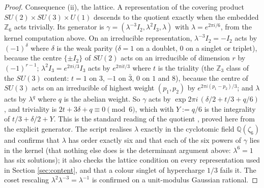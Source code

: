 \documentclass[11pt]{article}
\theoremstyle{definition}
\begin{document}
\begin{proof}
Consequence (ii), the lattice. A representation of the covering product $SU(2) \times SU(3) \times U(1)$ descends to the quotient exactly when the embedded $\mathbb{Z}_{6}$ acts trivially. Its generator is $\gamma = (\lambda^{-3}I_{2}, \lambda^{2}I_{3}, \lambda)$ with $\lambda = e^{2\pi i/6}$, from the kernel computation above. On an irreducible representation, $\lambda^{-3}I_{2} = -I_{2}$ acts by $(-1)^{\delta}$ where $\delta$ is the weak parity ($\delta = 1$ on a doublet, $0$ on a singlet or triplet), because the centre $\{\pm I_{2}\}$ of $SU(2)$ acts on an irreducible of dimension $r$ by $(-1)^{r-1}$; $\lambda^{2}I_{3} = e^{2\pi i/3}I_{3}$ acts by $e^{2\pi i t/3}$ where $t$ is the triality (the $\mathbb{Z}_{3}$ class of the $SU(3)$ content: $t = 1$ on $3$, $-1$ on $\bar{3}$, $0$ on $1$ and $8$), because the centre of $SU(3)$ acts on an irreducible of highest weight $(p_{1}, p_{2})$ by $e^{2\pi i(p_{1} - p_{2})/3}$; and $\lambda$ acts by $\lambda^{q}$ where $q$ is the abelian weight. So $\gamma$ acts by $\exp 2\pi i\,(\delta/2 + t/3 + q/6)$, and triviality is $2t + 3\delta + q \equiv 0 \pmod 6$, which with $Y := q/6$ is the integrality of $t/3 + \delta/2 + Y$. This is the standard reading of the quotient \cite{BaezHuerta2010, Tong2017}, proved here from the explicit generator. The script realises $\lambda$ exactly in the cyclotomic field $\mathbb{Q}(\zeta_{6})$ and confirms that $\lambda$ has order exactly six and that each of the six powers of $\gamma$ lies in the kernel (that nothing else does is the determinant argument above: $\lambda^{6} = 1$ has six solutions); it also checks the lattice condition on every representation used in Section \ref{sec:content}, and that a colour singlet of hypercharge $1/3$ fails it. The coset rescaling $\lambda^{2}\lambda^{-3} = \lambda^{-1}$ is confirmed on a unit-modulus Gaussian rational.
\end{proof}
\end{document}
